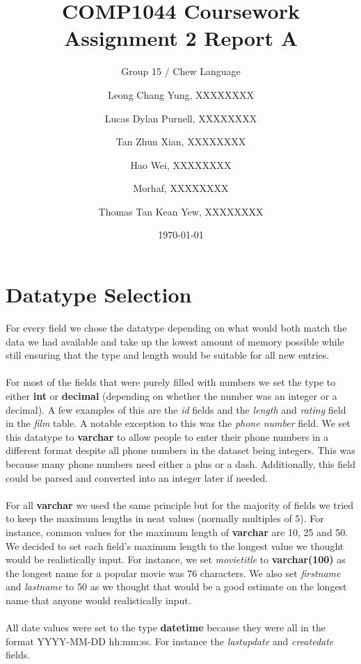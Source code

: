 \documentclass{article}
\title{COMP1044 Coursework Assignment 2 Report A}
\author{
	Group 15 / Chew Language\\
	\and
	Leong Chang Yung, XXXXXXXX
	\and
	Lucas Dylan Purnell, XXXXXXXX
	\and
	Tan Zhun Xian, XXXXXXXX
	\and
	Hao Wei, XXXXXXXX
	\and
	Morhaf, XXXXXXXX
	\and
	Thomas Tan Kean Yew, XXXXXXXX
}
\date{\today}
\begin{document}
\maketitle
\newpage
\section{Datatype Selection}
	For every field we chose the datatype depending on what would both match the data we had available and take up the lowest amount of memory possible 
	while still ensuring that the type and length would be suitable for all new entries. 
	\\\\
	For most of the fields that were purely filled with numbers we set the type to either \textbf{int} or \textbf{decimal} (depending on whether the number was an integer 
	or a decimal). A few examples of this are the \emph{id} fields and the \emph{length} and \emph{rating} field in the \emph{film} table. A notable exception to this was the 
	\emph{phone number} field. We set this datatype to \textbf{varchar} to allow people to enter their phone numbers in a different format despite all phone numbers in the 
	dataset being integers. This was because many phone numbers need either a plus or a dash. Additionally, this field could be parsed and converted into an integer later if needed.
	\\\\	
	For all \textbf{varchar} we used the same principle but for the majority of fields we tried to keep the maximum lengths in neat values (normally multiples of 5). For instance, common 
	values for the maximum length of \textbf{varchar} are 10, 25 and 50. We decided to set each field’s maximum length to the longest value we thought would be realistically input. 	
	For instance, we set \emph{movie\textunderscore title} to \textbf{varchar(100)} as the longest name for a popular movie was 76 characters. We also set \emph{first\textunderscore name} and 
	\emph{last\textunderscore name} to 50 as we thought that would be a good estimate on the longest name that anyone would realistically input.
	\\\\
	All date values were set to the type \textbf{datetime} because they were all in the format YYYY-MM-DD hh:mm:ss. For instance the \emph{last\textunderscore update} and
	\emph{create\textunderscore date} fields.
	
\end{document}
